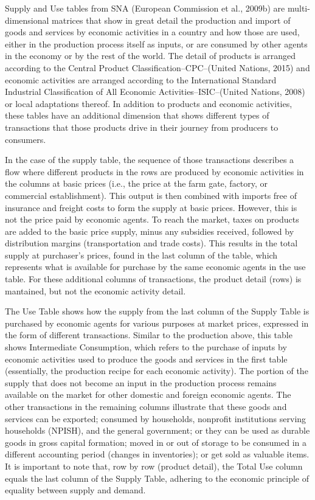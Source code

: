 \documentclass[
  letterpaper,
  DIV=11,
  numbers=noendperiod]{scrartcl}
\begin{document}
Supply and Use tables from SNA (European Commission et al., 2009b) are
multi-dimensional matrices that show in great detail the production and
import of goods and services by economic activities in a country and how
those are used, either in the production process itself as inputs, or
are consumed by other agents in the economy or by the rest of the world.
The detail of products is arranged according to the Central Product
Classification--CPC--(United Nations, 2015) and economic activities are
arranged according to the International Standard Industrial
Classification of All Economic Activities--ISIC--(United Nations, 2008)
or local adaptations thereof. In addition to products and economic
activities, these tables have an additional dimension that shows
different types of transactions that those products drive in their
journey from producers to consumers.

In the case of the supply table, the sequence of those transactions
describes a flow where different products in the rows are produced by
economic activities in the columns at basic prices (i.e., the price at
the farm gate, factory, or commercial establishment). This output is
then combined with imports free of insurance and freight costs to form
the supply at basic prices. However, this is not the price paid by
economic agents. To reach the market, taxes on products are added to the
basic price supply, minus any subsidies received, followed by
distribution margins (transportation and trade costs). This results in
the total supply at purchaser's prices, found in the last column of the
table, which represents what is available for purchase by the same
economic agents in the use table. For these additional columns of
transactions, the product detail (rows) is mantained, but not the
economic activity detail.

The Use Table shows how the supply from the last column of the Supply
Table is purchased by economic agents for various purposes at market
prices, expressed in the form of different transactions. Similar to the
production above, this table shows Intermediate Consumption, which
refers to the purchase of inputs by economic activities used to produce
the goods and services in the first table (essentially, the production
recipe for each economic activity). The portion of the supply that does
not become an input in the production process remains available on the
market for other domestic and foreign economic agents. The other
transactions in the remaining columns illustrate that these goods and
services can be exported; consumed by households, nonprofit institutions
serving households (NPISH), and the general government; or they can be
used as durable goods in gross capital formation; moved in or out of
storage to be consumed in a different accounting period (changes in
inventories); or get sold as valuable items. It is important to note
that, row by row (product detail), the Total Use column equals the last
column of the Supply Table, adhering to the economic principle of
equality between supply and demand.
\end{document}
